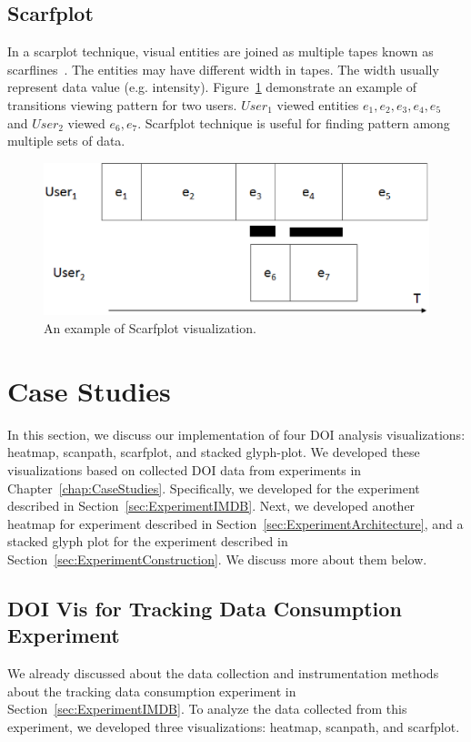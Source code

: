 \subsection{Scarfplot}
In a scarplot technique, visual entities are joined as multiple tapes known as scarflines~\cite{richardson2005looking}. The entities may have different width in tapes. The width usually represent data value (e.g. intensity). Figure~\ref{fig:scarfplotExample} demonstrate an example of transitions viewing pattern for two users. $User_1$ viewed entities $e_1, e_2, e_3, e_4,e_5$ and $User_2$ viewed $e_6, e_7$. Scarfplot technique is useful for finding pattern among multiple sets of data. 
\begin{figure}[htbp]
  \centering
  \includegraphics[width=\linewidth]{images/ScarfplotExample.eps}
  \caption{An example of Scarfplot visualization. }
	\label{fig:scarfplotExample}
\end{figure}

\section{Case Studies}
In this section, we discuss our implementation of four DOI analysis visualizations: heatmap, scanpath, scarfplot, and stacked glyph-plot. We developed these visualizations based on collected DOI data from experiments in Chapter~\ref{chap:CaseStudies}. Specifically, we developed  for the experiment described in Section~\ref{sec:ExperimentIMDB}. Next, we developed another heatmap for experiment described in Section~\ref{sec:ExperimentArchitecture}, and a stacked glyph plot for the experiment described in Section~\ref{sec:ExperimentConstruction}. We discuss more about them below. 

\subsection{DOI Vis for Tracking Data Consumption Experiment}
We already discussed about the data collection and instrumentation methods about the tracking data consumption experiment in Section~\ref{sec:ExperimentIMDB}. To analyze the data collected from this experiment, we developed three visualizations: heatmap, scanpath, and scarfplot. 


